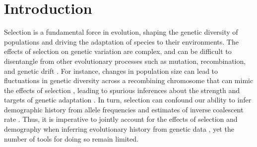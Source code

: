 \documentclass[hidelinks]{article}
\begin{document}
\section*{Introduction}
    \label{introduction}
    Selection is a fundamental force in evolution, shaping the
    genetic diversity of populations and driving the adaptation of
    species to their environments. The effects of selection
    on genetic variation are complex, and can be difficult to disentangle
    from other evolutionary processes such as mutation, recombination,
    and genetic drift \citep[e.g.,][]{gillespie1991causes}.
    For instance, changes in population size can lead to fluctuations
    in genetic diversity across a recombining chromosome
    that can mimic the effects of selection \citep{simonsen1995properties},
    leading to spurious inferences about the strength and targets of genetic adaptation
    \citep{simonsen1995properties,akey2004population,nielsen2005genomic}.
    In turn, selection can confound our ability to infer demographic
    history from allele frequencies \citep{ewing2016consequences,schrider2016effects} and
    estimates of inverse coalescent rate \citep{schrider2016effects, johri2021impact, cousins2024accurate}.
    Thus, it is imperative to jointly account for the effects of selection
    and demography when inferring evolutionary history from genetic data \citep[e.g.,][]{sheehan2016deep,johri2020toward},
    yet the number of tools for doing so remain limited.
\end{document}
